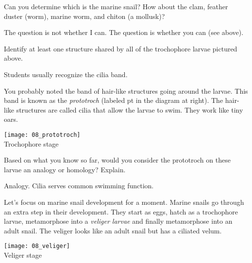 \documentclass[12pt, hidelinks]{exam}
\newcommand*\AnswerBox[2]{%
    \parbox[t][#1]{0.92\textwidth}{%
    \begin{solution}#2\end{solution}}
    \vspace{\stretch{1}}
}
\begin{document}
\begin{questions}

\question
Can you determine which is the marine snail? How about the
clam, feather duster (worm), marine worm, and chiton (a mollusk)?

\AnswerBox{1\baselineskip}{%
The question is not whether I can. The question is whether you can (see above).
}

\question
Identify at least one structure shared by all of the trochophore larvae pictured above.

\AnswerBox{1\baselineskip}{Students usually recognize the cilia band.}

\newpage

\begin{minipage}{0.75\textwidth}%
You probably noted the band of hair-like structures
going around the larvae. This band is known as the \emph{prototroch} (labeled pt
in the diagram at right). The hair-like structures are
called cilia that allow the larvae to swim. They work like tiny
oars.
\end{minipage}\hfill
\begin{minipage}{0.25\textwidth}%
\centering\texttt{[image: 08\_prototroch]}\\%
{\footnotesize Trochophore stage\footnotemark}%
\end{minipage}

\question
Based on what you know so far, would you consider the
prototroch on these larvae an analogy or homology? Explain.

\AnswerBox{4\baselineskip}{Analogy. Cilia serves common swimming function.}



\begin{minipage}{0.75\textwidth}%
Let's focus on marine snail development for a moment. Marine snails go 
through an extra step in their development.
They start as eggs, hatch as a trochophore larvae, metamorphose into a
\emph{veliger larvae} and finally metamorphose into an adult snail.
The veliger looks like an adult snail but has a ciliated velum.
\end{minipage}\hfill
\begin{minipage}{0.25\textwidth}%
\centering\texttt{[image: 08\_veliger]}\\
{\footnotesize Veliger stage\footnotemark}
\end{minipage}


\end{questions}
\end{document}
